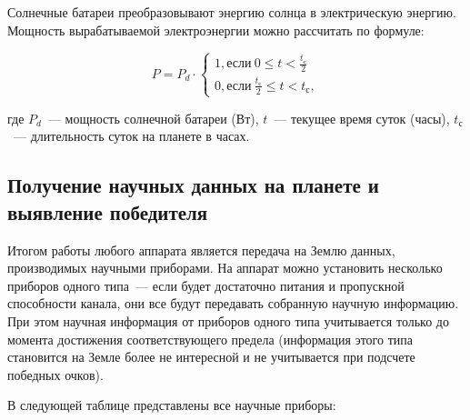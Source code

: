 \documentclass[12pt,a4paper]{article}
\begin{document}
Солнечные батареи преобразовывают энергию солнца в электрическую энергию. Мощность
вырабатываемой электроэнергии можно рассчитать по формуле:

$$
P = P_d \cdot \left\{
  \begin{array}{c}
    1, \text{если}~0 \leqslant t < \frac{t_{\text{с}}}{2}\\
    0, \text{если}~\frac{t_{\text{с}}}{2} \leqslant t < t_{\text{с}},
  \end{array}
\right.
$$

где $P_d$~--- мощность солнечной батареи (Вт), $t$~--- текущее время суток (часы),
$t_{\text{с}}$~--- длительность суток на планете в часах.

\subsection{Получение научных данных на планете и выявление победителя}

Итогом работы любого аппарата является передача на Землю данных, производимых научными
приборами. На аппарат можно установить несколько приборов одного типа~--- если будет
достаточно питания и пропускной способности канала, они все будут передавать собранную
научную информацию. При этом научная информация от приборов одного типа учитывается только
до момента достижения соответствующего предела (информация этого типа становится на Земле
более не интересной и не учитывается при подсчете победных очков).

В следующей таблице представлены все научные приборы:
\end{document}
